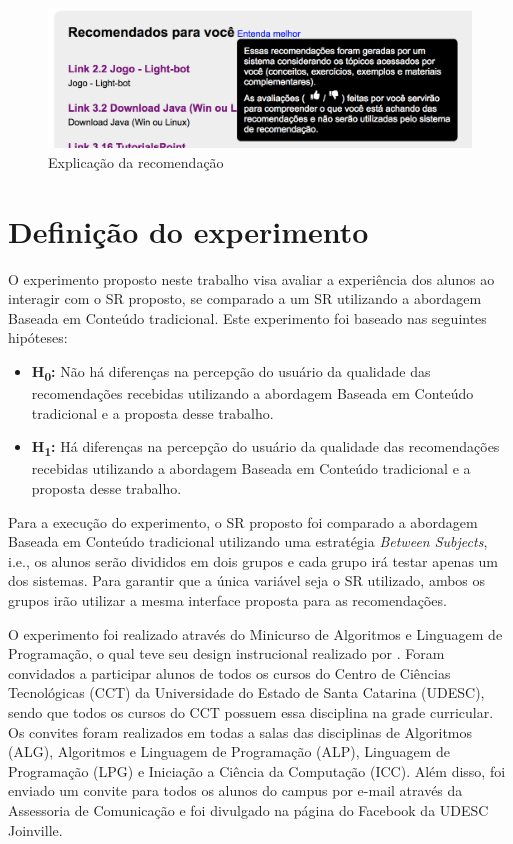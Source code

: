 \begin{figure}[htb]
  \caption{\label{fig:adaptweb-proposta-explicacao}Explicação da recomendação}
  \begin{center}
      \includegraphics[scale=0.6]{./Figuras/explicacao-das-recomendacoes.png}
  \end{center}
\end{figure}

\section{Definição do experimento}

O experimento proposto neste trabalho visa avaliar a experiência dos alunos ao interagir com o SR proposto, se comparado a um SR
utilizando a abordagem Baseada em Conteúdo tradicional. Este experimento foi
baseado nas seguintes hipóteses:

\begin{itemize}
\item \textbf{H\textsubscript{0}:} Não há diferenças na percepção do usuário da qualidade das recomendações recebidas utilizando a abordagem
Baseada em Conteúdo tradicional e a proposta desse trabalho.
\item \textbf{H\textsubscript{1}:} Há diferenças na percepção do usuário da qualidade das recomendações recebidas utilizando a abordagem
Baseada em Conteúdo tradicional e a proposta desse trabalho.
\end{itemize}

Para a execução do experimento, o SR proposto foi comparado a abordagem Baseada em Conteúdo tradicional utilizando uma
estratégia \textit{Between Subjects}, i.e., os alunos serão divididos em dois grupos e cada grupo irá testar apenas
um dos sistemas. Para garantir que a única variável seja o SR utilizado, ambos os grupos irão utilizar a mesma
interface proposta para as recomendações.

O experimento foi realizado através do Minicurso de Algoritmos e Linguagem de Programação, o qual teve seu design instrucional realizado por .
Foram convidados a participar alunos de todos os cursos do Centro de Ciências Tecnológicas (CCT) da Universidade do
Estado de Santa Catarina (UDESC), sendo que todos os cursos do CCT possuem essa disciplina na grade curricular. Os convites
foram realizados em todas a salas das disciplinas de Algoritmos (ALG), Algoritmos e Linguagem de Programação (ALP), Linguagem
de Programação (LPG) e Iniciação a Ciência da Computação (ICC). Além disso, foi enviado um convite para todos os alunos do
campus por e-mail através da Assessoria de Comunicação e foi divulgado na página do Facebook da UDESC Joinville.

